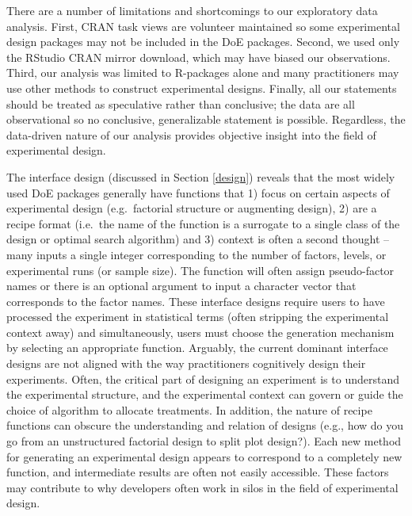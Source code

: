 \documentclass{article}
\begin{document}
There are a number of limitations and shortcomings to our exploratory
data analysis. First, CRAN task views are volunteer maintained so some
experimental design packages may not be included in the DoE packages.
Second, we used only the RStudio CRAN mirror download, which may have
biased our observations. Third, our analysis was limited to R-packages
alone and many practitioners may use other methods to construct
experimental designs. Finally, all our statements should be treated as
speculative rather than conclusive; the data are all observational so no
conclusive, generalizable statement is possible. Regardless, the
data-driven nature of our analysis provides objective insight into the
field of experimental design.

The interface design (discussed in Section \ref{design}) reveals that
the most widely used DoE packages generally have functions that 1) focus
on certain aspects of experimental design (e.g.~factorial structure or
augmenting design), 2) are a recipe format (i.e.~the name of the
function is a surrogate to a single class of the design or optimal
search algorithm) and 3) context is often a second thought -- many
inputs a single integer corresponding to the number of factors, levels,
or experimental runs (or sample size). The function will often assign
pseudo-factor names or there is an optional argument to input a
character vector that corresponds to the factor names. These interface
designs require users to have processed the experiment in statistical
terms (often stripping the experimental context away) and
simultaneously, users must choose the generation mechanism by selecting
an appropriate function. Arguably, the current dominant interface
designs are not aligned with the way practitioners cognitively design
their experiments. Often, the critical part of designing an experiment
is to understand the experimental structure, and the experimental
context can govern or guide the choice of algorithm to allocate
treatments. In addition, the nature of recipe functions can obscure the
understanding and relation of designs (e.g., how do you go from an
unstructured factorial design to split plot design?). Each new method
for generating an experimental design appears to correspond to a
completely new function, and intermediate results are often not easily
accessible. These factors may contribute to why developers often work in
silos in the field of experimental design.
\end{document}
